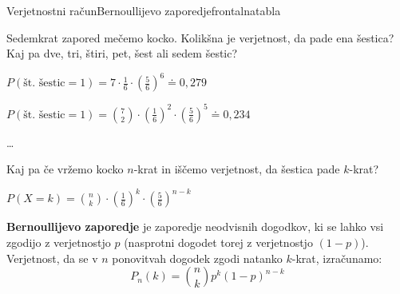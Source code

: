 \begin{priprava}{}{}{Verjetnostni račun}{Bernoullijevo zaporedje}{frontalna}{tabla}

Sedemkrat zapored mečemo kocko. Kolikšna je verjetnost, da pade ena šestica? Kaj pa dve, tri, štiri, pet, šest ali sedem šestic?


$ P(\text{št. šestic} = 1) = 7 \cdot \frac{1}{6} \cdot \left( \frac{5}{6} \right)^6 \doteq 0{,}279 $

$ P(\text{št. šestic} = 1) = \binom 7 2 \cdot \left( \frac{1}{6} \right)^2 \cdot \left( \frac{5}{6} \right)^5 \doteq 0{,}234 $

\ldots

Kaj pa če vržemo kocko $ n $-krat in iščemo verjetnost, da šestica pade $ k $-krat?

$ P(X = k) = \binom n k \cdot \left( \frac{1}{6} \right)^k \cdot \left( \frac{5}{6} \right)^{n-k} $

\textbf{Bernoullijevo zaporedje} je zaporedje neodvisnih dogodkov, ki se lahko vsi zgodijo z verjetnostjo $ p $ (nasprotni dogodet torej z verjetnostjo $ (1 - p) $). Verjetnost, da se v $ n $ ponovitvah dogodek zgodi natanko $ k $-krat, izračunamo:
$$ P_n(k) = \binom n k p^k (1 - p)^{n - k} $$

    
\end{priprava}